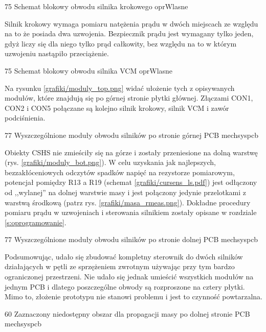 	{75}
	{Schemat blokowy obwodu silnika krokowego}
	{oprWlasne}
	
Silnik krokowy wymaga pomiaru natężenia prądu w dwóch miejscach ze względu na to że posiada dwa uzwojenia. Bezpiecznik prądu jest wymagany tylko jeden, gdyż liczy się dla niego tylko prąd całkowity, bez względu na to w którym uzwojeniu nastąpiło przeciążenie. 

	{75}
	{Schemat blokowy obwodu silnika VCM}
	{oprWlasne}

Na rysunku \ref{grafiki/moduly_top.png} widać ułożenie tych z opisywanych modułów, które znajdują się po górnej stronie płytki głównej. Złączami CON1, CON2 i CON5 połączane są kolejno silnik krokowy, silnik VCM i zawór podciśnienia.
	
	{77}
	{Wyszczególnione moduły obwodu silników po stronie górnej PCB}
	{mechsyspcb}
	
Obiekty CSHS nie zmieściły się na górze i zostały przeniesione na dolną warstwę (rys. \ref{grafiki/moduly_bot.png}). W celu uzyskania jak najlepszych, bezzakłóceniowych odczytów spadków napięć na rezystorze pomiarowym, potencjał pomiędzy R13 a R19 (schemat \ref{grafiki/cursens_ls.pdf}) jest odłączony od ,,wylanej'' na dolnej warstwie masy i jest połączony jedynie przelotkami z warstwą środkową (patrz rys. \ref{grafiki/masa_rmeas.png}). Dokładne procedury pomiaru prądu w uzwojeniach i sterowania silnikiem zostały opisane w rozdziale \ref{s:oprogramowanie}. 

	{77}
	{Wyszczególnione moduły obwodu silników po stronie dolnej PCB}
	{mechsyspcb}

Podsumowując, udało się zbudować kompletny sterownik do dwóch silników działających w pętli ze sprzężeniem zwrotnym używając przy tym bardzo ograniczonej przestrzeni. Nie udało się jednak umieścić wszystkich modułów na jednym PCB i dlatego poszczególne obwody są rozproszone na cztery płytki. Mimo to, złożenie prototypu nie stanowi problemu i jest to czynność powtarzalna.

	{60}
	{Zaznaczony niedostępny obszar dla propagacji masy po dolnej stronie PCB}
	{mechsyspcb}


\clearpage















